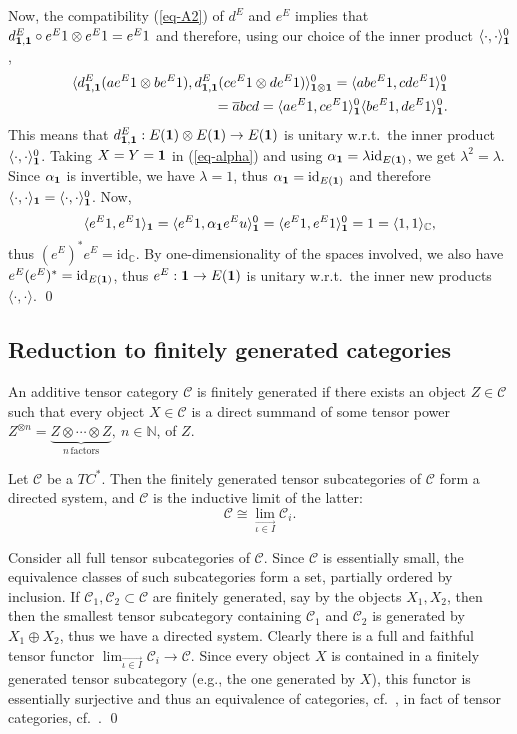 \documentclass[12pt]{article}
\theoremstyle{definition}
\theoremstyle{definition}
\theoremstyle{remark}
\def\2#1{{\mathcal #1}}
\def\7#1{{\mathbb #1}}
\def\1#1{{\bf #1}}
\def\ol#1{{\overline #1}}
\newcommand{\rarr}{\rightarrow}
\def\id{\mathrm{id}}
\begin{document}
Now, the compatibility (\ref{eq-A2}) of $d^E$ and $e^E$ implies that
$d^E_{\11,\11}\circ e^E1\otimes e^E1=e^E1$ and therefore, using our
choice of the inner product $\langle\cdot,\cdot\rangle_\11^0$,
\begin{eqnarray*} \langle d^E_{\11,\11}(ae^E1\otimes be^E1),d^E_{\11,\11}(ce^E1\otimes de^E1)\rangle^0_{\11\otimes\11}
   = \langle abe^E1,cde^E1\rangle^0_\11 \\
 =\ol{ab}cd 
  = \langle ae^E1,ce^E1\rangle^0_\11\langle
  be^E1,de^E1\rangle^0_\11. \end{eqnarray*}
This means that $d^E_{\11,\11}:E(\11)\otimes E(\11)\rarr E(\11)$ is unitary w.r.t.\ the inner
product $\langle\cdot,\cdot\rangle_\11^0$. Taking $X=Y=\11$ in (\ref{eq-alpha}) and using
$\alpha_\11=\lambda\id_{E(\11)}$, we get $\lambda^2=\lambda$. Since $\alpha_\11$ is invertible, we have
$\lambda=1$, thus $\alpha_\11=\id_{E(\11)}$ and therefore
$\langle\cdot,\cdot\rangle_\11=\langle\cdot,\cdot\rangle_\11^0$. Now,
\[ \langle e^E 1,e^E1\rangle_\11=\langle e^E
1,\alpha_\11e^Eu\rangle^0_\11 =\langle e^E
1,e^E1\rangle^0_\11=1=\langle1,1\rangle_\7C, \] thus
$(e^E)^*e^E=\id_\7C$. By one-dimensionality of the spaces involved, we
also have $e^E(e^E)^*=\id_{E(\11)}$, thus $e^E:\11\rarr E(\11)$ is
unitary w.r.t.\ the inner new products $\langle\cdot,\cdot\rangle$.
\qed





\subsection{Reduction to finitely generated categories}
\label{ss-fingen} \bdefin {} An additive
tensor category $\2C$ is finitely generated if there exists an object
$Z\in\2C$ such that every object $X\in\2C$ is a direct summand of some
tensor power $Z^{\otimes n}=\underbrace{Z\otimes\cdots\otimes
  Z}_{n\,\mathrm{factors}},\ n\in\7N$, of $Z$.  \edefin

\blemma \label{lem-ind}
Let $\2C$ be a $TC^*$. Then the finitely generated tensor subcategories of $\2C$ form a directed
system, and $\2C$ is the inductive limit of the latter:
\[ \2C\cong\lim_{\stackrel{\longrightarrow}{\iota\in I}} \2C_i. \]
\elemma

\prf Consider all full tensor subcategories of $\2C$. Since $\2C$ is
essentially small, the equivalence classes of such subcategories form
a set, partially ordered by inclusion.  If $\2C_1,\2C_2\subset\2C$ are
finitely generated, say by the objects $X_1,X_2$, then then the
smallest tensor subcategory containing $\2C_1$ and $\2C_2$ is
generated by $X_1\oplus X_2$, thus we have a directed system. Clearly
there is a full and faithful tensor functor
$\lim_{\stackrel{\longrightarrow}{\iota\in I}}\2C_i\rarr\2C$. Since
every object $X$ is contained in a finitely generated tensor
subcategory (e.g., the one generated by $X$), this functor is
essentially surjective and thus an equivalence of categories, cf.\
\cite{cwm}, in fact of tensor categories, cf.\ \cite{SR}.  \qed
\end{document}
